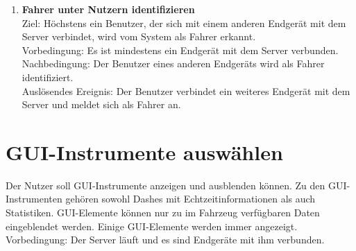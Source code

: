 \documentclass[pflichtenheft.tex]{subfiles}
\begin{document}
\begin{enumerate}
		\item{\textbf{Fahrer unter Nutzern identifizieren}} \label{driver2}
		\\ Ziel: Höchstens ein Benutzer, der sich mit einem anderen Endgerät mit dem Server verbindet, wird vom System als Fahrer erkannt.  \\
		Vorbedingung: Es ist mindestens ein Endgerät mit dem Server verbunden.\\
		Nachbedingung: Der Benutzer eines anderen Endgeräts wird als Fahrer identifiziert. \\
		Auslösendes Ereignis: Der Benutzer verbindet ein weiteres Endgerät mit dem Server und meldet sich als Fahrer an.

		\setcounter{enumTemp}{\value{enumi}}
		

	\end{enumerate}
	
	\section{GUI-Instrumente auswählen}
	Der Nutzer soll GUI-Instrumente anzeigen und ausblenden können. Zu den GUI-Instrumenten gehören sowohl Dashes mit Echtzeitinformationen als auch Statistiken. GUI-Elemente können nur zu im Fahrzeug verfügbaren Daten eingeblendet werden. Einige GUI-Elemente werden immer angezeigt.\\
	Vorbedingung: Der Server läuft und es sind Endgeräte mit ihm verbunden.
	
\end{document}
